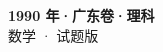 \documentclass[zihao=-4, a4paper]{ctexart}
\begin{document}
\begin{center}
  {\Large\bfseries 1990 年·广东卷·理科}\\[4pt]
  {\large 数学 · 试题版}
\end{center}
\medskip
{}

\end{document}
